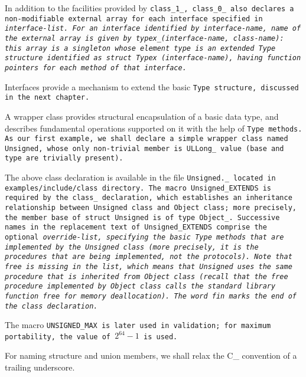 In addition to the facilities provided by \tt{class_1_},
\tt{class_0_} also declares a non-modifiable external
array for each interface specified in \it{interface-list}.
For an interface identified by \it{interface-name}, name of the external array
is given by \tt{typex_(}\it{interface-name}\tt{,} \it{class-name}\tt{)}:
this array is a singleton whose element type is an extended \tt{Type}
structure identified as \tt{struct Typex (}\it{interface-name}\tt{)},
having function pointers for each method of that interface.

\note Interfaces provide a mechanism to extend the basic
\tt{Type} structure, discussed in the next chapter.

\example A wrapper class provides structural encapsulation
of a basic data type, and describes fundamental operations
supported on it with the help of \tt{Type} methods.
As our first example, we shall declare a simple wrapper class named
\tt{Unsigned}, whose only non-trivial member is \tt{ULLong_ value}
(\tt{base} and \tt{type} are trivially present).


The above class declaration is available in the file
\tt{Unsigned._} located in \tt{examples/include/class} directory.
The macro \tt{Unsigned_EXTENDS} is required by the \tt{class_}
declaration, which establishes an inheritance relationship
between \tt{Unsigned} class and \tt{Object} class; more precisely,
the member \tt{base} of \tt{struct Unsigned} is of type \tt{Object_}.
Successive names in the replacement text of \tt{Unsigned_EXTENDS}
comprise the optional \it{override-list}, specifying the basic
\tt{Type} methods that are implemented by the \tt{Unsigned} class (more
precisely, it is the procedures that are being implemented, not the protocols).
Note that \tt{free} is missing in the list, which means that \tt{Unsigned}
uses the same procedure that is inherited from \tt{Object} class
(recall that the \tt{free} procedure implemented by \tt{Object} class
calls the standard library function \tt{free} for memory deallocation).
The word \tt{fin} marks the end of the class declaration.

The macro \tt{UNSIGNED_MAX} is later used in validation;
for maximum portability, the value of $2^{64} - 1$ is used.

\note For naming structure and union members, we shall
relax the C\_ convention of a trailing underscore.
